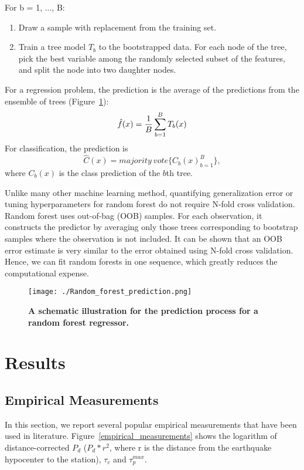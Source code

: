 \documentclass{article} %
\begin{document}
For b = 1, ..., B:
\begin{enumerate}
\item Draw a sample with replacement from the training set. 
\item Train a tree model $T_b$ to the bootstrapped data. For each node of
the tree, pick the best variable among the randomly selected subset of the features, and split the node into two daughter nodes.
\end{enumerate}
For a regression problem, the prediction is the average of the predictions from the ensemble of trees (Figure~\ref{RF}):
\begin{equation}\label{eq2}
\hat{f}(x) = {1 \over B} \sum_{b=1}^{B} T_b(x) 
\end{equation}
For classification, the prediction is
\begin{equation}\label{eq3}
\hat{C}(x) = majority \ vote \{ {C_b(x)}_{b=1}^{B} \},
\end{equation}
where $C_b(x)$ is the class prediction of the $b$th tree.

Unlike many other machine learning method, quantifying generalization error or tuning hyperparameters for random forest do not require N-fold cross validation. Random forest uses out-of-bag (OOB) samples. For each observation, it constructs the predictor by averaging only those trees corresponding to bootstrap samples where the observation is not included. It can be shown that an OOB error estimate is very similar to the error obtained using N-fold cross validation. Hence, we can fit random forests in one sequence, which greatly reduces the computational expense.


\begin{figure}[ht!]
	\centering
	\texttt{[image: ./Random\_forest\_prediction.png]}
	\caption{{\bf A schematic illustration for the prediction process for a random forest regressor.}}\label{RF} 
\end{figure}


\section{Results}

\subsection{Empirical Measurements}
In this section, we report several popular empirical measurements that have been used in literature. Figure~\ref{empirical_measurements} shows the logarithm of distance-corrected $P_d$ ($P_d * r^2$, where r is the distance from the earthquake hypocenter to the station), $\tau_c$ and $\tau_p^{max}$. 
\end{document}
